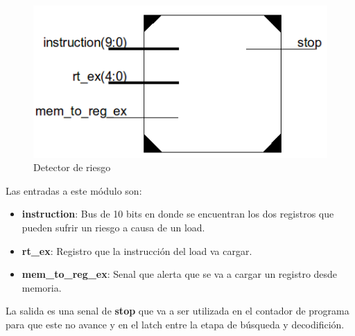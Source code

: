 \begin{figure}[H]
\centering
\includegraphics[scale=0.35]{img/data_hazard}
\caption{Detector de riesgo}
\label{fig:datahazard}
\end{figure}  

Las entradas a este m\'odulo son:
\begin{itemize}
  \item \textbf{instruction}: Bus de 10 bits en donde se encuentran los dos registros que pueden sufrir un riesgo a causa de un load.
  \item \textbf{rt\_ex}: Registro que la instrucci\'on del load va cargar.
  \item \textbf{mem\_to\_reg\_ex}: Senal que alerta que se va a cargar un registro desde memoria. 
\end{itemize}

La salida es una senal de \textbf{stop} que va a ser utilizada en el contador de programa para que este no avance y en el latch entre la etapa de b\'usqueda y decodifici\'on. 